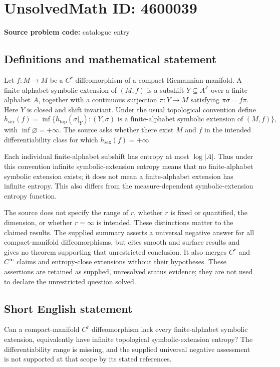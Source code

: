 \documentclass[11pt]{article}
\newcommand{\Z}{\mathbb{Z}}
\begin{document}
\section*{UnsolvedMath ID: 4600039}
\textbf{Source problem code:} catalogue entry
\subsection{Definitions and mathematical statement}
Let $f:M\to M$ be a $C^r$ diffeomorphism of a compact Riemannian manifold. A finite-alphabet symbolic extension of $(M,f)$ is a subshift $Y\subseteq A^{\Z}$ over a finite alphabet $A$, together with a continuous surjection $\pi:Y\to M$ satisfying $\pi\sigma=f\pi$. Here $Y$ is closed and shift invariant. Under the usual topological convention define
\[
h_{\mathrm{sex}}(f)=\inf\{h_{\mathrm{top}}(\sigma|_Y):(Y,\sigma)\text{ is a finite-alphabet symbolic extension of }(M,f)\},
\]
with $\inf\varnothing=+\infty$. The source asks whether there exist $M$ and $f$ in the intended differentiability class for which $h_{\mathrm{sex}}(f)=+\infty$.

Each individual finite-alphabet subshift has entropy at most $\log|A|$. Thus under this convention infinite symbolic-extension entropy means that no finite-alphabet symbolic extension exists; it does not mean a finite-alphabet extension has infinite entropy. This also differs from the measure-dependent symbolic-extension entropy function.

The source does not specify the range of $r$, whether $r$ is fixed or quantified, the dimension, or whether $r=\infty$ is intended. These distinctions matter to the claimed results. The supplied summary asserts a universal negative answer for all compact-manifold diffeomorphisms, but cites smooth and surface results and gives no theorem supporting that unrestricted conclusion. It also merges $C^r$ and $C^\infty$ claims and entropy-close extensions without their hypotheses. These assertions are retained as supplied, unresolved status evidence; they are not used to declare the unrestricted question solved.
\subsection{Short English statement}
Can a compact-manifold $C^r$ diffeomorphism lack every finite-alphabet symbolic extension, equivalently have infinite topological symbolic-extension entropy? The differentiability range is missing, and the supplied universal negative assessment is not supported at that scope by its stated references.
\end{document}
